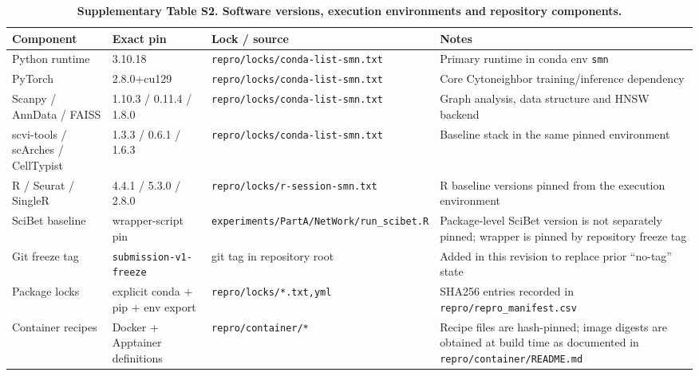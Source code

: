 \documentclass[11pt]{article}
\begin{document}
\begin{table}[htbp]
\centering
\caption{\textbf{Supplementary Table S2. Software versions, execution environments and repository components.}}
\label{tab:s2_software_versions}
\renewcommand{\arraystretch}{1.2}
\scriptsize
\begin{tabular}{p{} p{} p{} p{}}
\toprule
\textbf{Component} & \textbf{Exact pin} & \textbf{Lock / source} & \textbf{Notes} \\
\midrule
Python runtime & 3.10.18 & \texttt{repro/locks/conda-list-smn.txt} & Primary runtime in conda env \texttt{smn} \\
PyTorch & 2.8.0+cu129 & \texttt{repro/locks/conda-list-smn.txt} & Core Cytoneighbor training/inference dependency \\
Scanpy / AnnData / FAISS & 1.10.3 / 0.11.4 / 1.8.0 & \texttt{repro/locks/conda-list-smn.txt} & Graph analysis, data structure and HNSW backend \\
scvi-tools / scArches / CellTypist & 1.3.3 / 0.6.1 / 1.6.3 & \texttt{repro/locks/conda-list-smn.txt} & Baseline stack in the same pinned environment \\
R / Seurat / SingleR & 4.4.1 / 5.3.0 / 2.8.0 & \texttt{repro/locks/r-session-smn.txt} & R baseline versions pinned from the execution environment \\
SciBet baseline & wrapper-script pin & \texttt{experiments/PartA/NetWork/run\_scibet.R} & Package-level SciBet version is not separately pinned; wrapper is pinned by repository freeze tag \\
Git freeze tag & \texttt{submission-v1-freeze} & git tag in repository root & Added in this revision to replace prior ``no-tag'' state \\
Package locks & explicit conda + pip + env export & \texttt{repro/locks/*.txt,yml} & SHA256 entries recorded in \texttt{repro/repro\_manifest.csv} \\
Container recipes & Docker + Apptainer definitions & \texttt{repro/container/*} & Recipe files are hash-pinned; image digests are obtained at build time as documented in \texttt{repro/container/README.md} \\
\bottomrule
\end{tabular}
\normalsize
\end{table}
\end{document}
